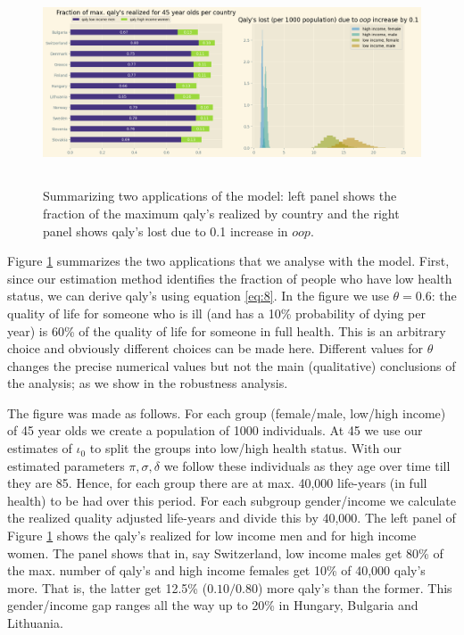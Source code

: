 \documentclass[a4paper,12pt]{article}
\begin{document}
\begin{figure}[htbp]
\centering
\includegraphics[height=6cm]{./figures/summary_two_applications.png}
\caption{\label{fig:applications}Summarizing two applications of the model: left panel shows the fraction of the maximum qaly's realized by country and the right panel shows qaly's lost due to 0.1 increase in \(oop\).}
\end{figure}

Figure \ref{fig:applications} summarizes the two applications that we analyse with the model. First, since our estimation method identifies the fraction of people who have low health status, we can derive qaly's using equation \eqref{eq:8}. In the figure we use \(\theta=0.6\): the quality of life for someone who is ill (and has a 10\% probability of dying per year) is 60\% of the quality of life for someone in full health. This is an arbitrary choice and obviously different choices can be made here. Different values for \(\theta\) changes the precise numerical values but not the main (qualitative) conclusions of the analysis; as we show in the robustness analysis.

The figure was made as follows. For each group (female/male, low/high income) of 45 year olds we create a population of 1000 individuals. At 45 we use our estimates of \(\iota_0\) to split the groups into low/high health status. With our estimated parameters \(\pi,\sigma,\delta\) we follow these individuals as they age over time till they are 85. Hence, for each group there are at max. 40,000 life-years (in full health) to be had over this period. For each subgroup gender/income we calculate the realized quality adjusted life-years and divide this by 40,000. The left panel of Figure \ref{fig:applications} shows the qaly's realized for low income men and for high income women.  The panel shows that in, say Switzerland, low income males get 80\% of the max. number of qaly's and high income females get 10\% of 40,000 qaly's more. That is, the latter get 12.5\% (\(0.10/0.80\)) more qaly's than the former. This gender/income gap ranges all the way up to 20\% in Hungary, Bulgaria and Lithuania.
\end{document}
